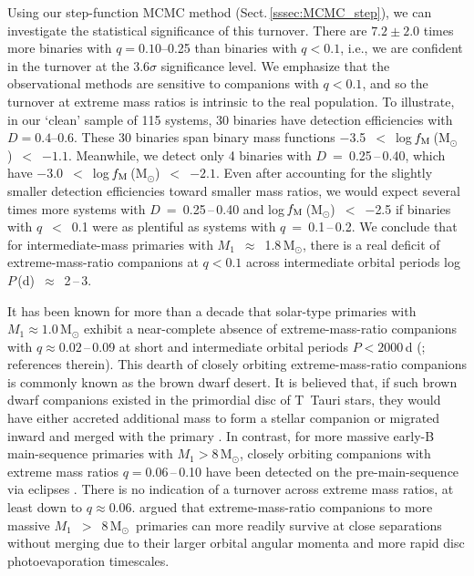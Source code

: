 \documentclass[a4paper,fleqn,usenatbib]{mnras}
\begin{document}
Using our step-function MCMC method (Sect.\,\ref{sssec:MCMC_step}), we can investigate the statistical significance of this turnover.  There are $7.2\pm2.0$ times more binaries with $q=0.10$--0.25 than binaries with $q<0.1$, i.e., we are confident in the turnover at the 3.6$\sigma$ significance level. We emphasize that the observational methods are sensitive to companions with $q<0.1$, and so the turnover at extreme mass ratios is intrinsic to the real population. To illustrate, in our `clean' sample of 115 systems, 30 binaries have detection efficiencies with $D=0.4$--0.6. These 30 binaries span binary mass functions $-$3.5~$<$~log\,$f_{\rm M}$\,(M$_{\odot}$)~$<$~$-1.1$. Meanwhile, we detect only 4 binaries with $D$~=~0.25\,--\,0.40, which have $-$3.0~$<$~log\,$f_{\rm M}$\,(M$_{\odot}$)~$<$~$-2.1$. Even after accounting for the slightly smaller detection efficiencies toward smaller mass ratios, we would expect several times more systems with $D$~=~0.25\,--\,0.40 and log\,$f_{\rm M}$\,(M$_{\odot}$)~$<$~$-$2.5 if binaries with $q$~$<$~0.1 were as plentiful as systems with $q$~=~0.1\,--\,0.2. We conclude that for intermediate-mass primaries with $M_1$~$\approx$~1.8\,M$_{\odot}$, there is a real deficit of extreme-mass-ratio companions at $q<0.1$ across intermediate orbital periods log\,$P$\,(d)~$\approx$~2\,--\,3.

It has been known for more than a decade that solar-type primaries with $M_1 \approx 1.0$\,M$_{\odot}$ exhibit a near-complete absence of extreme-mass-ratio companions with $q\approx0.02$\,--\,0.09 at short and intermediate orbital periods $P < 2000$\,d (\citealt{grether&lineweaver2006}; references therein). This dearth of closely orbiting extreme-mass-ratio companions is commonly known as the brown dwarf desert. It is believed that, if such brown dwarf companions existed in the primordial disc of T~Tauri stars, they would have either accreted additional mass to form a stellar companion or migrated inward and merged with the primary \citep{armitage&bonnell2002}. In contrast, for more massive early-B main-sequence primaries with $M_1 > 8$\,M$_{\odot}$, closely orbiting companions with extreme mass ratios $q=0.06$\,--\,0.10 have been detected on the pre-main-sequence via eclipses \citep{moe&distefano2015a}. There is no indication of a turnover across extreme mass ratios, at least down to $q \approx 0.06$.  \citet{moe&distefano2015a} argued that extreme-mass-ratio companions to more massive $M_1$~$>$~8\,M$_{\odot}$\ primaries can more readily survive at close separations without merging due to their larger orbital angular momenta and more rapid disc photoevaporation timescales. 
\end{document}
